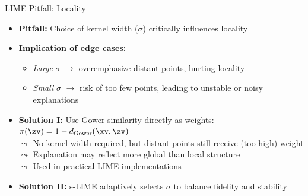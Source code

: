 \documentclass[11pt,compress,t,notes=noshow, aspectratio=169, xcolor=table]{beamer}
\begin{document}
\begin{frame}{LIME Pitfall: Locality }

\begin{itemize}
  \item \textbf{Pitfall:} Choice of kernel width (\(\sigma\)) critically influences locality
  \pause
  \item \textbf{Implication of edge cases:}
  \begin{itemize}
    \item \emph{Large} $\sigma$ $\rightarrow$ overemphasize distant points, hurting locality
    \item \emph{Small} $\sigma$ $\rightarrow$ risk of too few points, leading to unstable or noisy explanations
  \end{itemize}
  \pause
  \item  \textbf{Solution I:} Use Gower similarity directly as weights: \( \pi(\zv) = 1 - d_{\text{Gower}}(\xv, \zv) \)\\
  $\leadsto$ No kernel width required, but distant points still receive (too high) weight\\
  $\leadsto$ Explanation may reflect more global than local structure\\
  $\leadsto$ Used in practical LIME implementations 
  \pause
  \item \textbf{Solution II:} s-LIME adaptively selects \(\sigma\) to balance fidelity and stability 
\end{itemize}
\end{frame}
\end{document}
